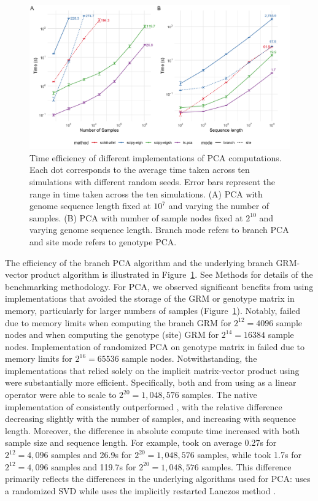 \begin{figure}
    \centering
    \includegraphics[width=\textwidth]{Figures/Fig2_benchmarking_plot.png}
    \caption{Time efficiency of different implementations of PCA computations.
    Each dot corresponds to the average time taken across ten simulations with different random seeds.
    Error bars represent the range in time taken across the ten simulations.
    (A) PCA with genome sequence length fixed at $10^{7}$ and varying the number of samples.
    (B) PCA with number of sample nodes fixed at $2^{10}$ and varying genome sequence length.
    Branch mode refers to branch PCA and site mode refers to genotype PCA.
    \label{fig:benchmarking}}
\end{figure}

The efficiency of the branch PCA algorithm
and the underlying branch GRM-vector product algorithm is illustrated in
Figure~\ref{fig:benchmarking}. 
See Methods for details of the benchmarking methodology.
For PCA, we observed significant benefits from using implementations that avoided the storage of the GRM or genotype matrix in memory,
particularly for larger numbers of samples (Figure~\ref{fig:benchmarking}).
%
Notably, \tsGRM{} failed due to memory limits
when computing the branch GRM for $2^{12} = 4096$ sample nodes and
when computing the genotype (site) GRM for $2^{14} = 16384$ sample nodes.
%
Implementation of randomized PCA on genotype matrix in \scikitallel{}
failed due to memory limits for $2^{16} = 65536$ sample nodes.
%
Notwithstanding, the implementations that relied solely on
the implicit matrix-vector product using \tskit{} were substantially more efficient.
%
Specifically, both \tsPCA{} and \eigsh{} from \scipy{} using \tsGRMv{} %
as a linear operator were able to scale to $2^{20} = 1,048,576$ samples.
%
The native implementation of \tsPCA{} consistently outperformed \eigsh{},
with the relative difference decreasing slightly with the number of samples, and increasing with sequence length.
%
Moreover, the difference in absolute compute time increased with both sample size and sequence length.
%
For example, \tsPCA{} took on average
0.27s for $2^{12} = 4,096$ samples and
26.9s for $2^{20} = 1,048,576$ samples,
while \eigsh{} took
  1.7s for $2^{12} = 4,096$ samples and
119.7s for $2^{20} = 1,048,576$ samples.
%
This difference primarily reflects the differences in the underlying algorithms used for PCA:
\tsPCA{} uses a randomized SVD while
\eigsh{} uses the implicitly restarted Lanczos method \citep{lehoucq1998arpack}.
